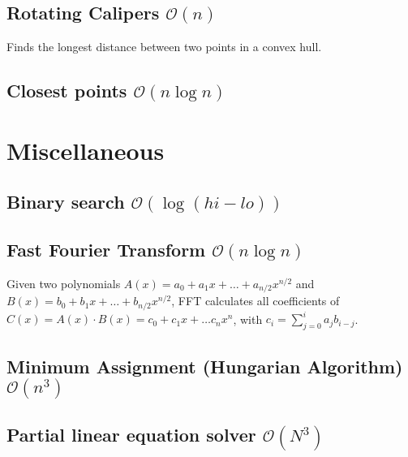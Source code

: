 \documentclass{article}
\begin{document}


\subsection{Rotating Calipers $\mathcal{O}(n)$}

Finds the longest distance between two points in a convex hull.



\subsection{Closest points $\mathcal{O}(n \log n)$}



\section{Miscellaneous}
\subsection{Binary search $\mathcal{O}(\log (hi - lo))$}



\subsection{Fast Fourier Transform $\mathcal{O}(n \log n)$}

Given two polynomials $A(x) = a_0 + a_1 x + \dots + a_{n/2} x^{n/2}$ and $B(x) = b_0 + b_1 x + \dots + b_{n/2} x^{n/2}$, FFT calculates all coefficients of $C(x) = A(x) \cdot B(x) = c_0 + c_1 x + \dots c_{n} x^{n}$, with $c_i = \sum_{j=0}^{i} a_j b_{i-j}$.



\subsection{Minimum Assignment (Hungarian Algorithm) $\mathcal{O}(n^{3})$}



\subsection{Partial linear equation solver $\mathcal{O}(N^3)$}


\end{document}
